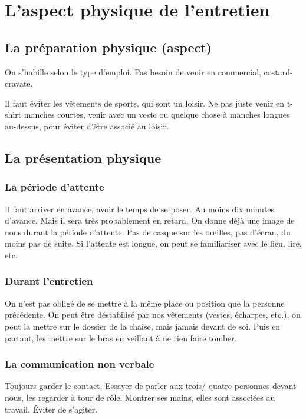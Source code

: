 \section{L'aspect physique de l'entretien}
\subsection{La préparation physique (aspect)}
On s'habille selon le type d'emploi. Pas besoin de venir en commercial, costard-cravate.

Il faut éviter les vêtements de sports, qui sont un loisir. Ne pas juste venir en t-shirt manches courtes, venir avec un veste ou quelque chose à manches longues au-dessus, pour éviter d'être associé au loisir.

\subsection{La présentation physique}
\subsubsection{La période d'attente}
Il faut arriver en avance, avoir le temps de se poser. Au moins dix minutes d'avance. Mais il sera très probablement en retard. On donne déjà une image de nous durant la période d'attente. Pas de casque sur les oreilles, pas d'écran, du moins pas de suite. Si l'attente est longue, on peut se familiariser avec le lieu, lire, etc.

\subsubsection{Durant l'entretien}
On n'est pas obligé de se mettre à la même place ou position que la personne précédente. On peut être déstabilisé par nos vêtements (vestes, écharpes, etc.), on peut la mettre sur le dossier de la chaise, mais jamais devant de soi. Puis en partant, les mettre sur le bras en veillant à ne rien faire tomber.

\subsubsection{La communication non verbale}
Toujours garder le contact. Essayer de parler aux trois/ quatre personnes devant nous, les regarder à tour de rôle. Montrer ses mains, elles sont associées au travail. Éviter de s'agiter.
